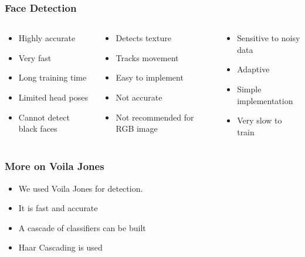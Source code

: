 \documentclass[aspectratio=149]{beamer}
\begin{document}
\begin{frame}
\frametitle{Face Detection}
\begin{columns}
	\begin{column}{.35\textwidth}
		\begin{itemize}
			\item Highly accurate
			\item Very fast
			\item Long training time
			\item Limited head poses
			\item Cannot detect black faces
		\end{itemize}
	\end{column}
	\begin{column}{.35\textwidth}
		\begin{itemize}
			\item Detects texture
			\item Tracks movement 
			\item Easy to implement
			\item Not accurate
			\item Not recommended for RGB image		
		\end{itemize}
	\end{column}
	\begin{column}{.35\textwidth}
		\begin{itemize}
			\item Sensitive to noisy data
			\item Adaptive
			\item Simple implementation
			\item Very slow to train		
		\end{itemize}
	\end{column}
\end{columns} 

\end{frame}


\begin{frame}
\frametitle{More on Voila Jones}
\begin{itemize}
	\item We used Voila Jones for detection.
	\item It is fast and accurate
	\item A cascade of classifiers can be built
	\item Haar Cascading is used 
\end{itemize}
\end{frame}
\end{document}
